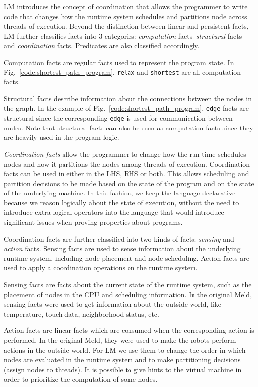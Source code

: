 LM introduces the concept of coordination that allows the programmer to write
code that changes how the runtime system schedules and partitions node across
threads of execution. Beyond the distinction between linear and persistent
facts, LM further classifies facts into 3 categories: \emph{computation} facts,
\emph{structural} facts and \emph{coordination} facts.
Predicates are also classified accordingly.

Computation facts are regular facts used to represent the program state. In
Fig.~\ref{code:shortest_path_program}, \texttt{relax} and \texttt{shortest} are
all computation facts.

Structural facts describe information about the connections between the nodes in
the graph. In the example of Fig.~\ref{code:shortest_path_program},
\texttt{edge} facts are structural since the corresponding \texttt{edge} is used
for communication between nodes.  Note that structural facts can also be seen as
computation facts since they are heavily used in the program logic.

\emph{Coordination facts} allow the programmer to change how the run time
schedules nodes and how it partitions the nodes among threads of execution.
Coordination facts can be used in either in the LHS, RHS or both.  This allows
scheduling and partition decisions to be made based on the state of the program
and on the state of the underlying machine.  In this fashion, we keep the
language declarative because we reason logically about the state of execution,
without the need to introduce extra-logical operators into the language that
would introduce significant issues when proving properties about programs.

Coordination facts are further classified into two kinds of facts:
\emph{sensing} and \emph{action} facts. Sensing facts are used to sense
information about the underlying runtime system, including node placement and
node scheduling.  Action facts are used to apply a coordination operations on
the runtime system.


Sensing facts are facts about the current state of the runtime system, such as
the placement of nodes in the CPU and scheduling information. In the original
Meld, sensing facts were used to get information about the outside world, like
temperature, touch data, neighborhood status, etc.

Action facts are linear facts which are consumed when the corresponding action
is performed. In the original Meld, they were used to make the robots perform
actions in the outside world.  For LM we use them to change the order in which
nodes are evaluated in the runtime system and to make partitioning decisions
(assign nodes to threads). It is possible to give hints to the virtual machine
in order to prioritize the computation of some nodes.

